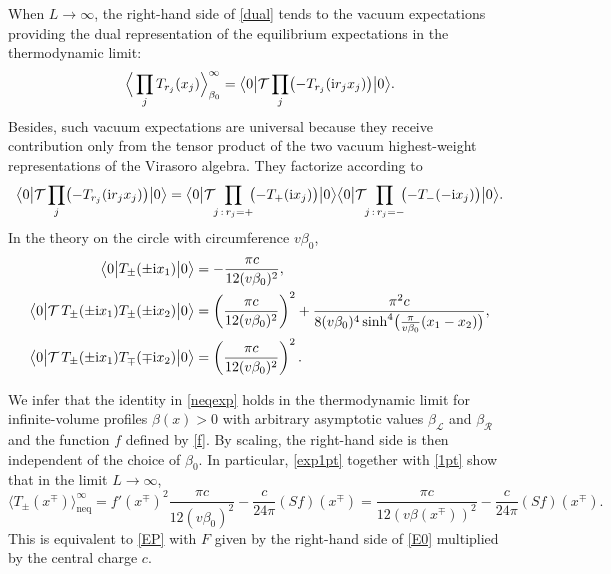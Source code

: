 \documentclass[12pt,a4paper]{article}
\newcommand{\ii}{{\rm i}}
\newcommand{\cL}{\mathcal{L}}
\newcommand{\cR}{\mathcal{R}}
\newcommand{\cT}{\mathcal{T}}
\theoremstyle{definition}
\theoremstyle{remark}
\begin{document}
When $L\to\infty$, the right-hand side of \eqref{dual} tends to the vacuum expectations providing the dual representation of the equilibrium expectations in the thermodynamic limit:
%
\begin{equation}
\label{dual0}  
\Big\langle \prod_{j} T_{r_j}(x_j) \Big\rangle^\infty_{\beta_0}=
\bigl\langle0\bigl| \cT \prod_{j} \bigl( -T_{r_j}(\ii r_jx_j) \bigr) \bigr|0\bigr\rangle.
\end{equation}
%
Besides, such vacuum expectations are universal because they receive contribution only from the tensor product of the two vacuum highest-weight representations of the Virasoro algebra.
They factorize according to
%
\begin{equation}
\label{factor}  
\bigl\langle0\bigl| \cT \prod_{j} \bigl( -T_{r_j}(\ii r_jx_j) \bigr) \bigr|0\bigr\rangle
= \bigl\langle0\bigl|
		\cT\hspace{-0.1cm}\prod_{j \, : \, r_j=+}\hspace{-0.1cm}\bigl( -T_{+}(\ii x_j) \bigr)
	\bigr|0\bigr\rangle
	\bigl\langle0\bigl|
	\cT\hspace{-0.1cm} \prod_{j \, : \, r_j=-} \hspace{-0.1cm}
        \bigl( -T_{-}(-\ii x_j) \bigr)
	\bigr|0\bigr\rangle.
\end{equation}
%
In the theory on the circle with circumference $v\beta_0$,
%
\begin{align}
\bigl\langle0\bigl| T_{\pm}(\pm\ii x_1) \bigr|0\bigr\rangle
& = - \frac{\pi c}{12(v\beta_0)^2},
		\label{1pt} \\
\bigl\langle0\bigl|\cT\, T_{\pm}(\pm\ii x_1)T_{\pm}(\pm\ii x_2) \bigr|0\bigr\rangle
& = \left( \frac{\pi c}{12(v\beta_0)^2} \right)^2
		+ \frac{\pi^2c}{8(v\beta_0)^4\sinh^4 \bigl(\frac{\pi}{v\beta_0}(x_1-x_2)\bigr)},
		\label{2pt} \\
\bigl\langle0\bigl| \cT\, T_{\pm}(\pm\ii x_1)T_{\mp}(\mp\ii x_2) \bigr|0\bigr\rangle
& = \left( \frac{\pi c}{12(v\beta_0)^2} \right)^2.\label{2pt-}
\end{align}
%

We infer that the identity in \eqref{neqexp} holds in the thermodynamic limit for infinite-volume profiles $\beta(x)>0$ with arbitrary asymptotic values $\beta_{\cL}$ and $\beta_{\cR}$ and the function $f$ defined by \eqref{f}.
By scaling, the right-hand side is then independent of the choice of $\beta_0$.
In particular, \eqref{exp1pt} together with \eqref{1pt} show that in the limit
$L\to\infty$,
%
\begin{equation}
\label{exp1ptinf}
\bigl\langle T_{\pm}(x^\mp)\bigr\rangle^\infty_{\text{neq}}
= f'(x^\mp)^2\frac{\pi c}{12(v\beta_0)^2} - \frac{c}{24\pi} (Sf)(x^\mp)
= \frac{\pi c}{12(v\beta(x^\mp))^2} - \frac{c}{24\pi} (Sf)(x^\mp).
\end{equation}
%
This is equivalent to \eqref{EP} with $F$ given by the right-hand side of \eqref{E0} multiplied by the central charge $c$. 
\end{document}
